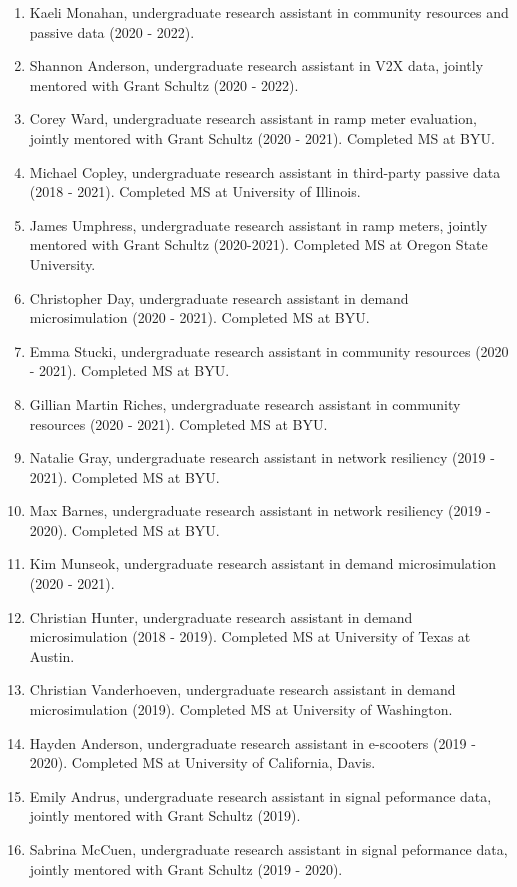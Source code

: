 \documentclass[margin,line]{res}
\newcounter{enuminitialize}
\newenvironment{myenum}[1][]
{%
 \setcounter{enuminitialize}{#1}
 \addtocounter{enuminitialize}{2}
 \begin{enumerate}[left= 4pt, itemsep=8pt, start=\value{enuminitialize}, label=\arabic*\addtocounter{enumi}{-2}]
}
{%
 \end{enumerate}
}
\begin{document}
\begin{resume}
\begin{myenum}[33]
  \item Kaeli Monahan, undergraduate research assistant in community resources and passive data (2020 - 2022). 
  \item Shannon Anderson, undergraduate research assistant in V2X data, jointly mentored with Grant Schultz (2020 - 2022). 
  \item Corey Ward, undergraduate research assistant in ramp meter evaluation, jointly mentored with Grant Schultz (2020 - 2021). Completed MS at BYU.
  \item Michael Copley, undergraduate research assistant in third-party passive data (2018 - 2021). Completed MS at University of Illinois.
  \item James Umphress, undergraduate research assistant in ramp meters, jointly mentored with Grant Schultz (2020-2021). Completed MS at Oregon State University.
  \item Christopher Day, undergraduate research assistant in demand microsimulation (2020 - 2021). Completed MS at BYU.
  \item Emma Stucki, undergraduate research assistant in community resources (2020 - 2021). Completed MS at BYU.
  \item Gillian Martin Riches, undergraduate research assistant in community resources (2020 - 2021). Completed MS at BYU.
  \item Natalie Gray, undergraduate research assistant in network resiliency (2019 - 2021). Completed MS at BYU.
  \item Max Barnes, undergraduate research assistant in network resiliency (2019 - 2020). Completed MS at BYU.
  \item Kim Munseok, undergraduate research assistant in demand microsimulation (2020 - 2021). 
  \item Christian Hunter, undergraduate research assistant in demand microsimulation (2018 - 2019). Completed MS at University of Texas at Austin.
  \item Christian Vanderhoeven, undergraduate research assistant in demand microsimulation (2019). Completed MS at University of Washington.
  \item Hayden Anderson, undergraduate research assistant in e-scooters (2019 - 2020). Completed MS at University of California, Davis.
  \item Emily Andrus, undergraduate research assistant in signal peformance data, jointly mentored with Grant Schultz (2019). 
  \item Sabrina McCuen, undergraduate research assistant in signal peformance data, jointly mentored with Grant Schultz (2019 - 2020). 
\end{myenum}


\end{resume}
\end{document}
